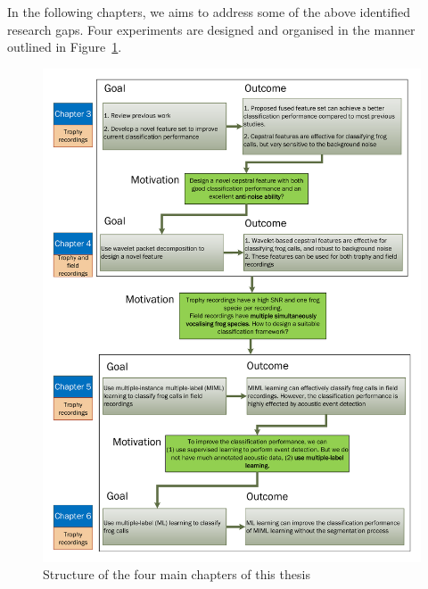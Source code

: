 In the following chapters, we aims to address some of the above identified research gaps. Four experiments are designed and organised in the manner outlined in Figure~\ref{fig:mainchapters}.


\begin{figure}[htb!]
\centering
\includegraphics[width=\textwidth]{image/Ch1/structure_chapters.pdf}
\caption[Logic structure of the four experimental chapters of this thesis]{Structure of the four main chapters of this thesis}
\label{fig:mainchapters}
\end{figure}








